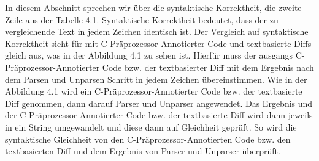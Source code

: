 In diesem Abschnitt sprechen wir über die syntaktische Korrektheit, die zweite Zeile aus der Tabelle 4.1. Syntaktische Korrektheit bedeutet, dass der zu vergleichende Text in jedem Zeichen identisch ist. Der Vergleich auf syntaktische Korrektheit sieht für mit C-Präprozessor-Annotierter Code und textbasierte Diffs gleich aus, was in der Abbildung 4.1 zu sehen ist. Hierfür muss der ausgangs C-Präprozessor-Annotierter Code bzw. der textbasierter Diff mit dem Ergebnis nach dem Parsen und Unparsen Schritt in jedem Zeichen übereinstimmen. Wie in der Abbildung 4.1 wird ein C-Präprozessor-Annotierter Code bzw. der textbasierte Diff genommen, dann darauf Parser und Unparser angewendet. Das Ergebnis und der C-Präprozessor-Annotierter Code bzw. der textbasierte Diff wird dann jeweils in ein String umgewandelt und diese dann auf Gleichheit geprüft. So wird die syntaktische Gleichheit von den C-Präprozessor-Annotierten Code bzw. den textbasierten Diff und dem Ergebnis von Parser und Unparser überprüft.

